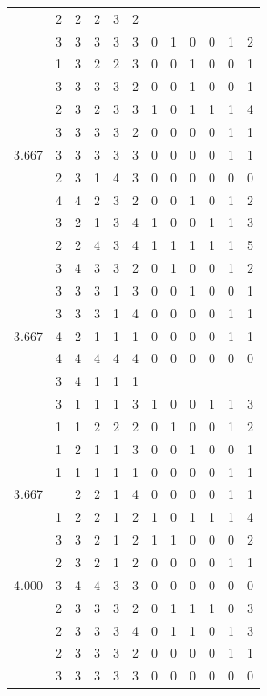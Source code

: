 \documentclass[]{msu-thesis}
\theoremstyle{definition}
\theoremstyle{definition}
\theoremstyle{definition}
\theoremstyle{remark}
\begin{document}
\begin{table}
{\begin{tabular}[t]{rrrrrrrrrrrr}
 & 2 & 2 & 2 & 3 & 2 &  &  &  &  &  & \\
 & 3 & 3 & 3 & 3 & 3 & 0 & 1 & 0 & 0 & 1 & 2\\
 & 1 & 3 & 2 & 2 & 3 & 0 & 0 & 1 & 0 & 0 & 1\\
 & 3 & 3 & 3 & 3 & 2 & 0 & 0 & 1 & 0 & 0 & 1\\
 & 2 & 3 & 2 & 3 & 3 & 1 & 0 & 1 & 1 & 1 & 4\\
 & 3 & 3 & 3 & 3 & 2 & 0 & 0 & 0 & 0 & 1 & 1\\
3.667 & 3 & 3 & 3 & 3 & 3 & 0 & 0 & 0 & 0 & 1 & 1\\
 & 2 & 3 & 1 & 4 & 3 & 0 & 0 & 0 & 0 & 0 & 0\\
 & 4 & 4 & 2 & 3 & 2 & 0 & 0 & 1 & 0 & 1 & 2\\
 & 3 & 2 & 1 & 3 & 4 & 1 & 0 & 0 & 1 & 1 & 3\\
 & 2 & 2 & 4 & 3 & 4 & 1 & 1 & 1 & 1 & 1 & 5\\
 & 3 & 4 & 3 & 3 & 2 & 0 & 1 & 0 & 0 & 1 & 2\\
 & 3 & 3 & 3 & 1 & 3 & 0 & 0 & 1 & 0 & 0 & 1\\
 & 3 & 3 & 3 & 1 & 4 & 0 & 0 & 0 & 0 & 1 & 1\\
3.667 & 4 & 2 & 1 & 1 & 1 & 0 & 0 & 0 & 0 & 1 & 1\\
 & 4 & 4 & 4 & 4 & 4 & 0 & 0 & 0 & 0 & 0 & 0\\
 & 3 & 4 & 1 & 1 & 1 &  &  &  &  &  & \\
 & 3 & 1 & 1 & 1 & 3 & 1 & 0 & 0 & 1 & 1 & 3\\
 & 1 & 1 & 2 & 2 & 2 & 0 & 1 & 0 & 0 & 1 & 2\\
 & 1 & 2 & 1 & 1 & 3 & 0 & 0 & 1 & 0 & 0 & 1\\
 & 1 & 1 & 1 & 1 & 1 & 0 & 0 & 0 & 0 & 1 & 1\\
3.667 &  & 2 & 2 & 1 & 4 & 0 & 0 & 0 & 0 & 1 & 1\\
 & 1 & 2 & 2 & 1 & 2 & 1 & 0 & 1 & 1 & 1 & 4\\
 & 3 & 3 & 2 & 1 & 2 & 1 & 1 & 0 & 0 & 0 & 2\\
 & 2 & 3 & 2 & 1 & 2 & 0 & 0 & 0 & 0 & 1 & 1\\
4.000 & 3 & 4 & 4 & 3 & 3 & 0 & 0 & 0 & 0 & 0 & 0\\
 & 2 & 3 & 3 & 3 & 2 & 0 & 1 & 1 & 1 & 0 & 3\\
 & 2 & 3 & 3 & 3 & 4 & 0 & 1 & 1 & 0 & 1 & 3\\
 & 2 & 3 & 3 & 3 & 2 & 0 & 0 & 0 & 0 & 1 & 1\\
 & 3 & 3 & 3 & 3 & 3 & 0 & 0 & 0 & 0 & 0 & 0\\

\end{tabular}}
\end{table}
\end{document}
